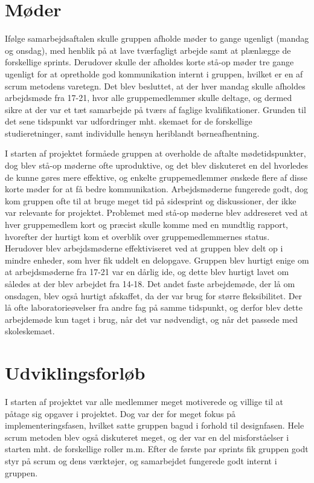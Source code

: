 \section*{Møder}
Ifølge samarbejdsaftalen skulle gruppen afholde møder to gange ugenligt (mandag og onsdag), med henblik på at lave tværfagligt arbejde samt at plænlægge
de forskellige sprints. Derudover skulle der afholdes korte stå-op møder tre gange ugenligt for at opretholde god kommunikation internt i gruppen,
hvilket er en af scrum metodens varetegn.
Det blev besluttet, at der hver mandag skulle afholdes arbejdsmøde fra 17-21, hvor alle gruppemedlemmer skulle deltage, og dermed sikre at der var
et tæt samarbejde på tværs af faglige kvalifikationer. Grunden til det sene tidspunkt var udfordringer mht. skemaet for de forskellige studieretninger,
samt individulle hensyn heriblandt børneafhentning. 

I starten af projektet formåede gruppen at overholde de aftalte mødetidspunkter, dog blev stå-op møderne ofte uproduktive, og det blev diskuteret en del
hvorledes de kunne gøres mere effektive, og enkelte gruppemedlemmer ønskede flere af disse korte møder for at få bedre kommunikation. Arbejdsmøderne fungerede godt,
dog kom gruppen ofte til at bruge meget tid på sidesprint og diskussioner, der ikke var relevante for projektet.
Problemet med stå-op møderne blev addreseret ved at hver gruppemedlem kort og præcist skulle komme med en mundtlig rapport, hvorefter der hurtigt kom et overblik
over gruppemedlemmernes status. Herudover blev arbejdsmøderne effektiviseret ved at gruppen blev delt op i mindre enheder, som hver fik uddelt en delopgave. 
Gruppen blev hurtigt enige om at arbejdsmøderne fra 17-21 var en dårlig ide, og dette blev hurtigt lavet om således at der blev arbejdet fra 14-18.
Det andet faste arbejdemøde, der lå om onsdagen, blev også hurtigt afskaffet, da der var brug for større fleksibilitet. Der lå ofte laboratorieøvelser
fra andre fag på samme tidspunkt, og derfor blev dette arbejdemøde kun taget i brug, når det var nødvendigt, og når det passede med skoleskemaet.    

\section*{Udviklingsforløb}
I starten af projektet var alle medlemmer meget motiverede og villige til at påtage sig opgaver i projektet. Dog var der for meget fokus på implementeringsfasen,
hvilket satte gruppen bagud i forhold til designfasen.
Hele scrum metoden blev også diskuteret meget, og der var en del misforståelser i starten mht. de forskellige roller m.m. Efter de første par sprints
fik gruppen godt styr på scrum og dens værktøjer, og samarbejdet fungerede godt internt i gruppen.

